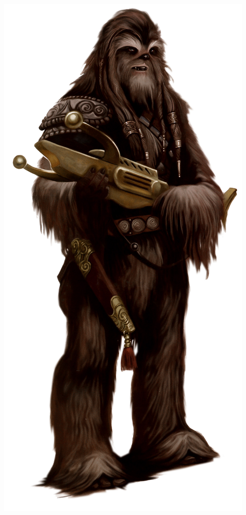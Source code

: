 \documentclass[twoside]{article}
\begin{document}
\noindent\begin{minipage}{0.3\textwidth}
	\includegraphics[width=1\linewidth]{../img/species/wookie}
\end{minipage}%
\end{document}
